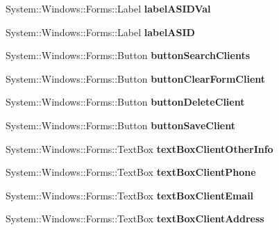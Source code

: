 \begin{DoxyCompactItemize}
System\+::\+Windows\+::\+Forms\+::\+Label {\bfseries label\+A\+S\+I\+D\+Val}
\item 
\hypertarget{class_magazyn_1_1_magazin_a95fd0332dd2e9546faa1a583d19cae49}{}\label{class_magazyn_1_1_magazin_a95fd0332dd2e9546faa1a583d19cae49} 
System\+::\+Windows\+::\+Forms\+::\+Label {\bfseries label\+A\+S\+ID}
\item 
\hypertarget{class_magazyn_1_1_magazin_a8798cddfa4c8d8e7d301609c4079a2bc}{}\label{class_magazyn_1_1_magazin_a8798cddfa4c8d8e7d301609c4079a2bc} 
System\+::\+Windows\+::\+Forms\+::\+Button {\bfseries button\+Search\+Clients}
\item 
\hypertarget{class_magazyn_1_1_magazin_a23d4a82914701993fc750726db0723d5}{}\label{class_magazyn_1_1_magazin_a23d4a82914701993fc750726db0723d5} 
System\+::\+Windows\+::\+Forms\+::\+Button {\bfseries button\+Clear\+Form\+Client}
\item 
\hypertarget{class_magazyn_1_1_magazin_a223107da7e7b028d411db00df7366490}{}\label{class_magazyn_1_1_magazin_a223107da7e7b028d411db00df7366490} 
System\+::\+Windows\+::\+Forms\+::\+Button {\bfseries button\+Delete\+Client}
\item 
\hypertarget{class_magazyn_1_1_magazin_a442a82af3dce9df133c64a8ddb86f9ec}{}\label{class_magazyn_1_1_magazin_a442a82af3dce9df133c64a8ddb86f9ec} 
System\+::\+Windows\+::\+Forms\+::\+Button {\bfseries button\+Save\+Client}
\item 
\hypertarget{class_magazyn_1_1_magazin_aae593d139051b15f0702343897b8f002}{}\label{class_magazyn_1_1_magazin_aae593d139051b15f0702343897b8f002} 
System\+::\+Windows\+::\+Forms\+::\+Text\+Box {\bfseries text\+Box\+Client\+Other\+Info}
\item 
\hypertarget{class_magazyn_1_1_magazin_ad9e8a448c83d4d98d91c86fa11c0f044}{}\label{class_magazyn_1_1_magazin_ad9e8a448c83d4d98d91c86fa11c0f044} 
System\+::\+Windows\+::\+Forms\+::\+Text\+Box {\bfseries text\+Box\+Client\+Phone}
\item 
\hypertarget{class_magazyn_1_1_magazin_a7ba97a0e74e72f682c0755e87d0760f8}{}\label{class_magazyn_1_1_magazin_a7ba97a0e74e72f682c0755e87d0760f8} 
System\+::\+Windows\+::\+Forms\+::\+Text\+Box {\bfseries text\+Box\+Client\+Email}
\item 
\hypertarget{class_magazyn_1_1_magazin_a8a307db4a2cbc9246917eb7f0e29f074}{}\label{class_magazyn_1_1_magazin_a8a307db4a2cbc9246917eb7f0e29f074} 
System\+::\+Windows\+::\+Forms\+::\+Text\+Box {\bfseries text\+Box\+Client\+Address}
\item 
\hypertarget{class_magazyn_1_1_magazin_abcc2939e8e2ccef4fe8b87549411f8ff}{}\label{class_magazyn_1_1_magazin_abcc2939e8e2ccef4fe8b87549411f8ff} 

\end{DoxyCompactItemize}

